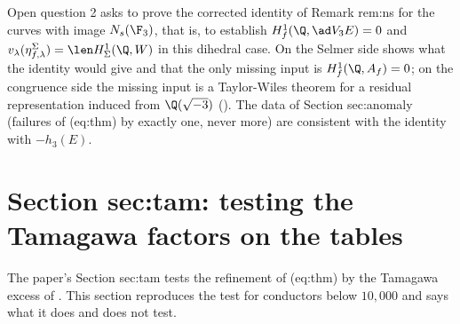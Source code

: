 \begin{remark}\label{rem:blochkato:open-question-2}
Open question 2 asks to prove the corrected identity of Remark rem:ns for the curves with image $N_s(\F_3)$, that is, to establish $H^1_f(\Q,\ad V_3E)=0$ and
$v_\lambda(\eta^\Sigma_{f,\lambda})=\len H^1_\Sigma(\Q,W)$ in this dihedral case. On the Selmer side  shows what the identity would give and that the
only missing input is $H^1_f(\Q,A_f)=0$; on the congruence side the missing input is a Taylor-Wiles theorem for a residual representation induced from $\Q(\sqrt{-3})$
(). The data of Section sec:anomaly (failures of (eq:thm) by exactly one, never more) are consistent with the identity with $-h_3(E)$.
\end{remark}

\section[Section sec:tam]{Section sec:tam: testing the Tamagawa factors on the tables}\label{sec:blochkato:sectam}

The paper's Section sec:tam tests the refinement of (eq:thm) by the Tamagawa excess of . This section reproduces the test for
conductors below $10{,}000$ and says what it does and does not test.


